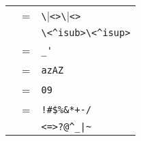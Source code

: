 \begin{isabellebody}
\begin{isamarkuptext}
\begin{center}
\begin{supertabular}{rcl}
     & = & \verb|\|\verb|<|\verb|>|\isa{{\isachardoublequote}\ \ {\isacharbar}\ \ {\isachardoublequote}}\verb|\|\verb|<|\verb|>| \\
          &   & \verb|\<^isub>|\isa{{\isachardoublequote}\ \ {\isacharbar}\ \ {\isachardoublequote}}\verb|\<^isup>| \\
     & = & \verb|_|\isa{{\isachardoublequote}\ \ {\isacharbar}\ \ {\isachardoublequote}}\verb|'| \\
     & = & \verb|a|\isa{{\isachardoublequote}\ \ {\isacharbar}\ {\isasymdots}\ {\isacharbar}\ \ {\isachardoublequote}}\verb|z|\isa{{\isachardoublequote}\ \ {\isacharbar}\ \ {\isachardoublequote}}\verb|A|\isa{{\isachardoublequote}\ \ {\isacharbar}\ \ {\isasymdots}\ {\isacharbar}\ \ {\isachardoublequote}}\verb|Z| \\
     & = & \verb|0|\isa{{\isachardoublequote}\ \ {\isacharbar}\ \ {\isasymdots}\ {\isacharbar}\ \ {\isachardoublequote}}\verb|9| \\
     & = & \verb|!|\isa{{\isachardoublequote}\ \ {\isacharbar}\ \ {\isachardoublequote}}\verb|#|\isa{{\isachardoublequote}\ \ {\isacharbar}\ \ {\isachardoublequote}}\verb|$|\isa{{\isachardoublequote}\ \ {\isacharbar}\ \ {\isachardoublequote}}\verb|%|\isa{{\isachardoublequote}\ \ {\isacharbar}\ \ {\isachardoublequote}}\verb|&|\isa{{\isachardoublequote}\ \ {\isacharbar}\ \ {\isachardoublequote}}\verb|*|\isa{{\isachardoublequote}\ \ {\isacharbar}\ \ {\isachardoublequote}}\verb|+|\isa{{\isachardoublequote}\ \ {\isacharbar}\ \ {\isachardoublequote}}\verb|-|\isa{{\isachardoublequote}\ \ {\isacharbar}\ \ {\isachardoublequote}}\verb|/|\isa{{\isachardoublequote}\ \ {\isacharbar}{\isachardoublequote}} \\
    & & \verb|<|\isa{{\isachardoublequote}\ \ {\isacharbar}\ \ {\isachardoublequote}}\verb|=|\isa{{\isachardoublequote}\ \ {\isacharbar}\ \ {\isachardoublequote}}\verb|>|\isa{{\isachardoublequote}\ \ {\isacharbar}\ \ {\isachardoublequote}}\verb|?|\isa{{\isachardoublequote}\ \ {\isacharbar}\ \ {\isachardoublequote}}\verb|@|\isa{{\isachardoublequote}\ \ {\isacharbar}\ \ {\isachardoublequote}}\verb|^|\isa{{\isachardoublequote}\ \ {\isacharbar}\ \ {\isachardoublequote}}\verb|_|\isa{{\isachardoublequote}\ \ {\isacharbar}\ \ {\isachardoublequote}}\verb||\verb,|,\verb||\isa{{\isachardoublequote}\ \ {\isacharbar}\ \ {\isachardoublequote}}\verb|~| \\

\end{supertabular}
\end{center}
\end{isamarkuptext}
\end{isabellebody}
